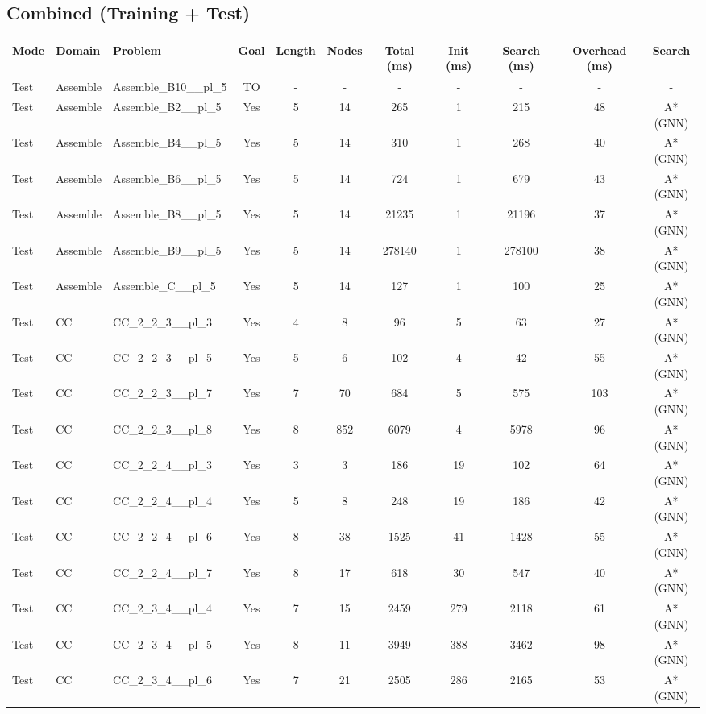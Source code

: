 \documentclass{article}
\begin{document}
\subsection*{Combined (Training + Test)}
\begin{tabular}{lllcccccccc}
\toprule
Mode & Domain & Problem & Goal & Length & Nodes & Total (ms) & Init (ms) & Search (ms) & Overhead (ms) & Search \\
\midrule
Test & Assemble & Assemble\_B10\_\_pl\_5 & TO & - & - & - & - & - & - & - \\
Test & Assemble & Assemble\_B2\_\_pl\_5 & Yes & 5 & 14 & 265 & 1 & 215 & 48 & A*(GNN) \\
Test & Assemble & Assemble\_B4\_\_pl\_5 & Yes & 5 & 14 & 310 & 1 & 268 & 40 & A*(GNN) \\
Test & Assemble & Assemble\_B6\_\_pl\_5 & Yes & 5 & 14 & 724 & 1 & 679 & 43 & A*(GNN) \\
Test & Assemble & Assemble\_B8\_\_pl\_5 & Yes & 5 & 14 & 21235 & 1 & 21196 & 37 & A*(GNN) \\
Test & Assemble & Assemble\_B9\_\_pl\_5 & Yes & 5 & 14 & 278140 & 1 & 278100 & 38 & A*(GNN) \\
Test & Assemble & Assemble\_C\_\_pl\_5 & Yes & 5 & 14 & 127 & 1 & 100 & 25 & A*(GNN) \\
Test & CC & CC\_2\_2\_3\_\_pl\_3 & Yes & 4 & 8 & 96 & 5 & 63 & 27 & A*(GNN) \\
Test & CC & CC\_2\_2\_3\_\_pl\_5 & Yes & 5 & 6 & 102 & 4 & 42 & 55 & A*(GNN) \\
Test & CC & CC\_2\_2\_3\_\_pl\_7 & Yes & 7 & 70 & 684 & 5 & 575 & 103 & A*(GNN) \\
Test & CC & CC\_2\_2\_3\_\_pl\_8 & Yes & 8 & 852 & 6079 & 4 & 5978 & 96 & A*(GNN) \\
Test & CC & CC\_2\_2\_4\_\_pl\_3 & Yes & 3 & 3 & 186 & 19 & 102 & 64 & A*(GNN) \\
Test & CC & CC\_2\_2\_4\_\_pl\_4 & Yes & 5 & 8 & 248 & 19 & 186 & 42 & A*(GNN) \\
Test & CC & CC\_2\_2\_4\_\_pl\_6 & Yes & 8 & 38 & 1525 & 41 & 1428 & 55 & A*(GNN) \\
Test & CC & CC\_2\_2\_4\_\_pl\_7 & Yes & 8 & 17 & 618 & 30 & 547 & 40 & A*(GNN) \\
Test & CC & CC\_2\_3\_4\_\_pl\_4 & Yes & 7 & 15 & 2459 & 279 & 2118 & 61 & A*(GNN) \\
Test & CC & CC\_2\_3\_4\_\_pl\_5 & Yes & 8 & 11 & 3949 & 388 & 3462 & 98 & A*(GNN) \\
Test & CC & CC\_2\_3\_4\_\_pl\_6 & Yes & 7 & 21 & 2505 & 286 & 2165 & 53 & A*(GNN) \\

\end{tabular}
\end{document}

